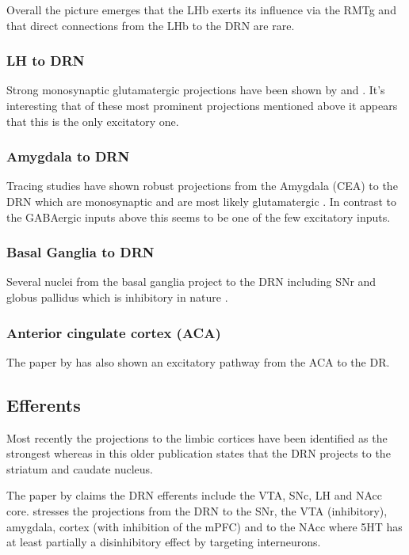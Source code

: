 \documentclass[12pt,a4paper]{article}
\begin{document}
Overall the picture emerges that the LHb exerts its influence via the RMTg and that direct connections from the LHb to the DRN are rare.

\subsubsection{LH to DRN}

Strong monosynaptic glutamatergic projections have been shown by \citep{Lee2003} and \citep{Aghajanian1990}. It's interesting that of these most prominent projections mentioned above it appears that this is the only excitatory one.

\subsubsection{Amygdala to DRN}

Tracing studies have shown robust projections from the Amygdala (CEA) to the DRN \citep{PollakDorocic2014} which are monosynaptic and are most likely glutamatergic \citep{Swanson1998}. In contrast to the GABAergic inputs above this seems to be one of the few excitatory inputs.

\subsubsection{Basal Ganglia to DRN}

Several nuclei from the basal ganglia project to the DRN including SNr and globus pallidus which is inhibitory in nature \citep{PollakDorocic2014}.

\subsubsection{Anterior cingulate cortex (ACA)}

The paper by  \citep{PollakDorocic2014} has also shown an excitatory pathway from the ACA to the DR.

\subsection{Efferents}

Most recently the projections to the limbic cortices have been identified as the strongest \citep{Linley2013} \citep{Roberts2011} whereas in this older publication \citep{Reisine1984} states that the DRN projects to the striatum and caudate nucleus. 

The paper by \citep{Vertes2010} claims the DRN efferents include the VTA, SNc, LH and NAcc core. \citep{Nakamura2013} stresses the projections from the DRN to the SNr, the VTA (inhibitory), amygdala, cortex (with inhibition of the mPFC) and to the NAcc where 5HT has at least partially a disinhibitory effect by targeting interneurons.
\end{document}
